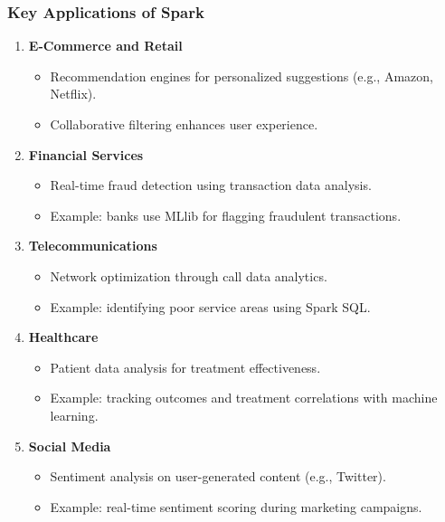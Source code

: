 \documentclass[aspectratio=169]{beamer}
\begin{document}
\begin{frame}[fragile]
  \frametitle{Key Applications of Spark}
  \begin{enumerate}
    \item \textbf{E-Commerce and Retail}
      \begin{itemize}
        \item Recommendation engines for personalized suggestions (e.g., Amazon, Netflix).
        \item Collaborative filtering enhances user experience.
      \end{itemize}
    
    \item \textbf{Financial Services}
      \begin{itemize}
        \item Real-time fraud detection using transaction data analysis.
        \item Example: banks use MLlib for flagging fraudulent transactions.
      \end{itemize}
    
    \item \textbf{Telecommunications}
      \begin{itemize}
        \item Network optimization through call data analytics.
        \item Example: identifying poor service areas using Spark SQL.
      \end{itemize}
    
    \item \textbf{Healthcare}
      \begin{itemize}
        \item Patient data analysis for treatment effectiveness.
        \item Example: tracking outcomes and treatment correlations with machine learning.
      \end{itemize}
    
    \item \textbf{Social Media}
      \begin{itemize}
        \item Sentiment analysis on user-generated content (e.g., Twitter).
        \item Example: real-time sentiment scoring during marketing campaigns.
      \end{itemize}
  \end{enumerate}
\end{frame}
\end{document}
